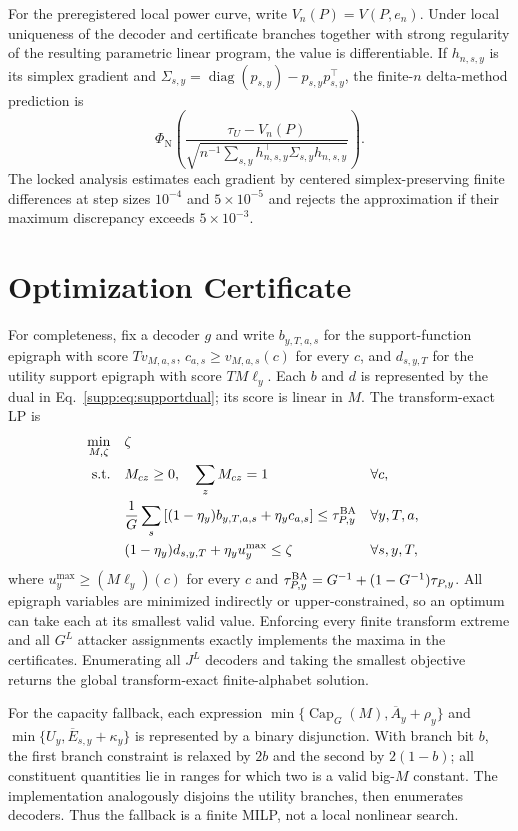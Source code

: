 For the preregistered local power curve, write $V_n(P)=V(P,e_n)$. Under local
uniqueness of the decoder and certificate branches together with strong
regularity of the resulting parametric linear program, the value is
differentiable. If $h_{n,s,y}$ is its simplex gradient and
$\Sigma_{s,y}=\operatorname{diag}(p_{s,y})-p_{s,y}p_{s,y}^\top$, the finite-$n$
delta-method prediction is
\begin{equation}
 \Phi_{\mathrm N}\!\left(
 \frac{\tau_U-V_n(P)}{
 \sqrt{n^{-1}\sum_{s,y}h_{n,s,y}^\top\Sigma_{s,y}h_{n,s,y}}}
 \right).
 \label{supp:eq:power}
\end{equation}
The locked analysis estimates each gradient by centered simplex-preserving
finite differences at step sizes $10^{-4}$ and $5\times10^{-5}$ and rejects the
approximation if their maximum discrepancy exceeds $5\times10^{-3}$.

\section{Optimization Certificate}

For completeness, fix a decoder $g$ and write
$b_{y,T,a,s}$ for the support-function epigraph with score
$Tv_{M,a,s}$, $c_{a,s}\geq v_{M,a,s}(c)$ for every $c$, and
$d_{s,y,T}$ for the utility support epigraph with score $TM\ell_y$. Each $b$
and $d$ is represented by the dual in Eq.~\eqref{supp:eq:supportdual}; its score
is linear in $M$. The transform-exact LP is
\begin{align}
 \min_{M,\zeta}\quad&\zeta
 \label{supp:eq:exact-lp}\\
 \mathrm{s.t.}\quad&M_{cz}\geq0,\quad\sum_zM_{cz}=1 &&\forall c,\nonumber\\
 &\frac1G\sum_s\left[(1-\eta_y)b_{y,T,a,s}
 +\eta_yc_{a,s}\right]\leq\tau^{\rm BA}_{P,y}
 &&\forall y,T,a,\nonumber\\
 &(1-\eta_y)d_{s,y,T}+\eta_yu_y^{\max}\leq\zeta
 &&\forall s,y,T,\nonumber
\end{align}
where $u_y^{\max}\geq(M\ell_y)(c)$ for every $c$ and
$\tau^{\rm BA}_{P,y}=G^{-1}+(1-G^{-1})\tau_{P,y}$. All epigraph variables are
minimized indirectly or upper-constrained, so an optimum can take each at its
smallest valid value. Enforcing every finite transform extreme and all $G^L$
attacker assignments exactly implements the maxima in the certificates.
Enumerating all $J^L$ decoders and taking the smallest objective returns the
global transform-exact finite-alphabet solution.

For the capacity fallback, each expression
$\min\{\operatorname{Cap}_G(M),\overline A_y+\rho_y\}$ and
$\min\{U_y,\overline E_{s,y}+\kappa_y\}$ is represented by a binary disjunction.
With branch bit $b$, the first branch constraint is relaxed by $2b$ and the
second by $2(1-b)$; all constituent quantities lie in ranges for which two is a
valid big-$M$ constant. The implementation analogously disjoins the utility
branches, then enumerates decoders. Thus the fallback is a finite MILP, not a
local nonlinear search.

